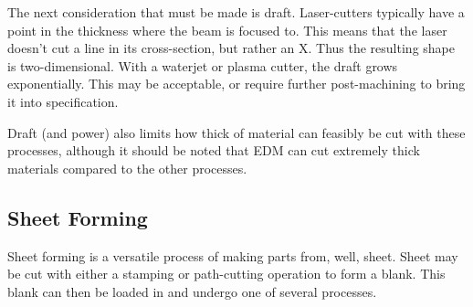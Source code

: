   The next consideration that must be made is draft. Laser-cutters typically have a point in the thickness where the beam is focused to. This means that the laser doesn't cut a line in its cross-section, but rather an X. Thus the resulting shape is two-dimensional. With a waterjet or plasma cutter, the draft grows exponentially. This may be acceptable, or require further post-machining to bring it into specification.
 
 Draft (and power) also limits how thick of material can feasibly be cut with these processes, although it should be noted that EDM can cut extremely thick materials compared to the other processes.
 
 \subsection{Sheet Forming}
 Sheet forming is a versatile process of making parts from, well, sheet. Sheet may be cut with either a stamping or path-cutting operation to form a blank. This blank can then be loaded in and undergo one of several processes.
 
